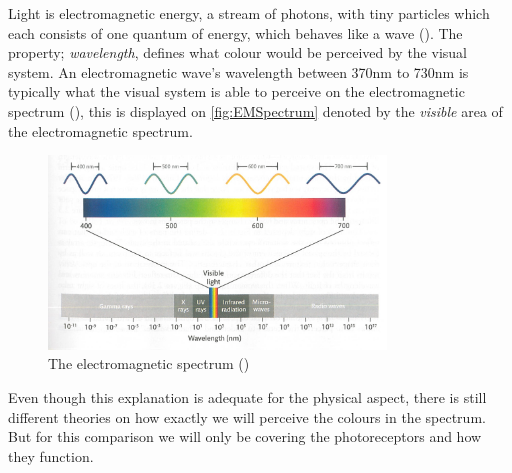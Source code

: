 \documentclass{article}
\newcommand{\goodcite}[1]{ {(\cite{#1})}}
\begin{document}
Light is electromagnetic energy, a stream of photons, with tiny particles which each consists of one quantum of energy, which behaves like a wave\goodcite{hsp}. The property; \textit{wavelength}, defines what colour would be perceived by the visual system. An electromagnetic wave's wavelength between 370nm to 730nm is typically what the visual system is able to perceive on the electromagnetic spectrum\goodcite{hsp}, this is displayed on \autoref{fig:EMSpectrum} denoted by the \textit{visible} area of the electromagnetic spectrum.
\begin{figure}[H]
  \centering
  \includegraphics[width=0.8\textwidth]{img/EMSpectrum.jpg}
  \caption{The electromagnetic spectrum\goodcite{hsp}}
  \label{fig:EMSpectrum}
\end{figure}
Even though this explanation is adequate for the physical aspect, there is still different theories on how exactly we will perceive the colours in the spectrum. But for this comparison we will only be covering the photoreceptors and how they function.%


\end{document}
